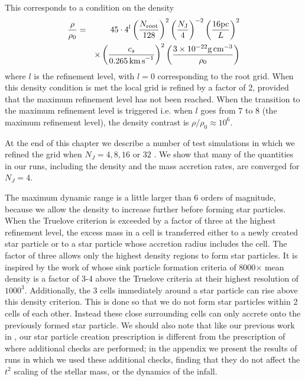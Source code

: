\documentclass[../dissertation.tex]{subfiles}
\begin{document}
This corresponds to a condition on the density 
%
\begin{eqnarray}
\frac{\rho}{\rho_0} &=& 45 \cdot 4^l
\left( \frac{N_{\rm root}}{128} \right)^2 
\left( \frac{N_{\rm J}}{4} \right)^{-2} 
\left( \frac{16 \rm{pc}}{L} \right)^2 \nonumber\\
&&\times\left( \frac{c_s}{0.265\, {\rm km\, s}^{-1}} \right)^2
\left( \frac{3 \times10^{-22} {\rm g\, cm}^{-3}}{\rho_0} \right)
\label{eq:hydro_refinement_criteria}
\end{eqnarray}
%
where $l$ is the refinement level, with $l = 0$ corresponding to the root grid.
When this density condition is met the local grid is refined by a factor of 2, 
provided that the maximum refinement level has not been reached. 
When the transition to the maximum refinement level is triggered i.e. when $l$ goes from $7$ to $8$ (the maximum refinement level),
the density contrast is $\rho / \rho_0 \approx 10^6$. 

At the end of this chapter we describe a number of test simulations in which we refined the grid when 
$N_J=4, 8, 16$ or $32$ \citep{2011ApJ...731...62F}. We show that many of the quantities in our runs, including the density and the mass accretion rates, are converged for $N_J=4$.

The maximum dynamic range is a little larger than 6 orders of magnitude, because we allow the density to increase further before forming star particles.
When the Truelove criterion is exceeded by a factor of three at the highest refinement level, the excess 
mass in a cell is transferred either to a newly created star particle or to a 
star particle whose accretion radius includes the cell. The factor of three allows only the highest density regions to form star particles.  It is inspired by the work of \citet{2011ApJ...730...40P} whose sink particle formation criteria of 8000$\times$ mean density is a factor of 3-4 above the Truelove criteria at their highest resolution of $1000^3$. 
Additionally, the 3 cells immediately around a star particle can rise above this density criterion. 
This is done so that we do not form star particles within 2 cells of each other. 
Instead these close surrounding cells can only accrete onto the previously formed star particle.
We should also note that like our previous work in \citet{2015ApJ...800...49L}, our star particle 
creation prescription is different from the prescription of 
 \citet{2010ApJ...713..269F} where additional checks are performed; in the appendix
we present the results of runs in which we used these additional checks, finding that they
do not affect the $t^2$ scaling of the stellar mass, or the dynamics of the infall.
\end{document}

